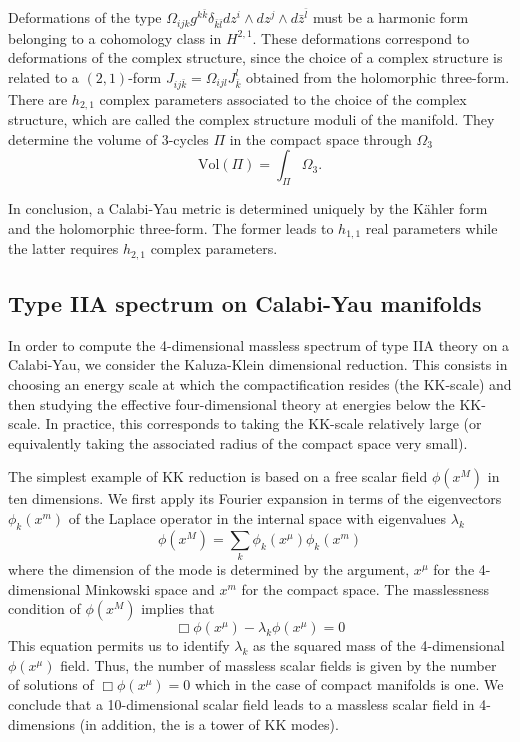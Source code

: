 Deformations of the type $\Omega_{ijk}g^{k\bar k}\delta_{\bar k\bar l}dz^i\wedge dz^j \wedge d\bar z^{\bar l}$ must be a harmonic form belonging to a cohomology class in $H^{2,1}$.
These deformations correspond to deformations of the complex structure, 
since the choice of a complex structure is related to a $(2,1)$-form  $J_{ij\bar k}= \Omega_{ijl}J^l_{\bar k}$ 
obtained from the holomorphic three-form.
There are $h_{2,1}$ complex parameters associated to the choice of the complex structure, which are called the complex structure moduli of the manifold.
They determine the volume of 3-cycles $\Pi$ in the compact space through $\Omega_3$ 
\begin{equation}
  \mathrm{Vol}(\Pi)=\int_\Pi \Omega_3.
\end{equation}

In conclusion, a Calabi-Yau metric is determined uniquely by the Kähler form and the holomorphic three-form.
The former leads to $h_{1,1}$ real parameters while the latter requires $h_{2,1}$ complex parameters.


\subsection{Type IIA spectrum on Calabi-Yau manifolds}
In order to compute the 4-dimensional massless spectrum of type IIA theory on a Calabi-Yau, we consider the 
Kaluza-Klein dimensional reduction.
This consists in choosing an energy scale at which the compactification resides (the KK-scale)
and then studying the effective four-dimensional theory at energies below the KK-scale.
In practice, this corresponds to taking the KK-scale relatively large (or equivalently taking the associated radius of the compact space very small). 

The simplest example of KK reduction is based on a free scalar field $\phi(x^M)$ in ten dimensions.
We first apply its Fourier expansion in terms of the eigenvectors $\phi_k(x^m)$ of the Laplace operator in the internal space  with eigenvalues $\lambda_k$
\begin{equation}
  \phi(x^M)= \sum_k \phi_k(x^\mu)\phi_k(x^m)
\end{equation}
where the dimension of the mode is determined by the argument, $x^\mu$ for the 4-dimensional Minkowski space and $x^m$ for the compact space.
The masslessness condition of $\phi(x^M)$ implies that
\begin{equation}
 \Box \phi(x^\mu) - \lambda_k \phi(x^\mu)=0 
\end{equation}
This equation permits us to identify $\lambda_k$  as the squared mass of the 4-dimensional $\phi(x^\mu)$ field.
Thus, the number of massless scalar fields is given by the number of solutions of $\Box \phi(x^\mu)=0$ which in the
case of compact manifolds is one.
We conclude that a 10-dimensional scalar field leads to a massless scalar field in 4-dimensions (in addition, the is a tower of KK modes).

